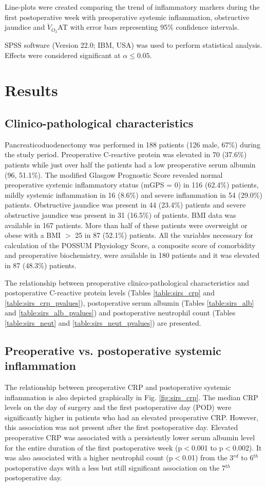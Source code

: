 Line-plots were created comparing the trend of inflammatory markers during the first postoperative week with preoperative systemic inflammation, obstructive jaundice and $\dot{V}_{O_2}$AT with error bars representing 95\% confidence intervals. 

SPSS software (Version 22.0; IBM, USA) was used to perform statistical analysis. 
Effects were considered significant at $\alpha \leq0.05$. 

\clearpage
\section{Results}

\subsection{Clinico-pathological characteristics}

Pancreaticoduodenectomy was performed in 188 patients (126 male, 67\%) during the study period.
Preoperative C-reactive protein was elevated in 70 (37.6\%) patients while just over half the patients had a low preoperative serum albumin (96, 51.1\%). 
The modified Glasgow Prognostic Score revealed normal preoperative systemic inflammatory status (mGPS = 0) in 116 (62.4\%) patients, mildly systemic inflammation in 16 (8.6\%) and severe inflammation in 54 (29.0\%) patients. 
Obstructive jaundice was present in 44 (23.4\%) patients and severe obstructive jaundice was present in 31 (16.5\%) of patients. 
BMI data was available in 167 patients. 
More than half of these patients were overweight or obese with a BMI $>$ 25 in 87 (52.1\%) patients.
All the variables necessary for calculation of the POSSUM Physiology Score, a composite score of comorbidity and preoperative biochemistry, were available in 180 patients and it was elevated in 87 (48.3\%) patients.

The relationship between preoperative clinico-pathological characteristics and postoperative C-reactive protein levels (Tables \ref{table:sirs_crp} and \ref{table:sirs_crp_pvalues}), postoperative serum albumin (Tables \ref{table:sirs_alb} and \ref{table:sirs_alb_pvalues}) and postoperative neutrophil count (Tables \ref{table:sirs_neut} and \ref{table:sirs_neut_pvalues}) are presented.

\subsection{Preoperative vs. postoperative systemic inflammation}
The relationship between preoperative CRP and postoperative systemic inflammation is also depicted graphically in Fig. \ref{fig:sirs_crp}. 
The median CRP levels on the day of surgery and the first postoperative day (POD) were significantly higher in patients who had an elevated preoperative CRP. 
However, this association was not present after the first postoperative day.
Elevated preoperative CRP was associated with a persistently lower serum albumin level for the entire duration of the first postoperative week (p$<$0.001 to p$<$0.002).
It was also associated with a higher neutrophil count (p$<$0.01) from the 3$^{rd}$ to 6$^{th}$ postoperative days with a less but still significant association on the 7$^{th}$ postoperative day. 

